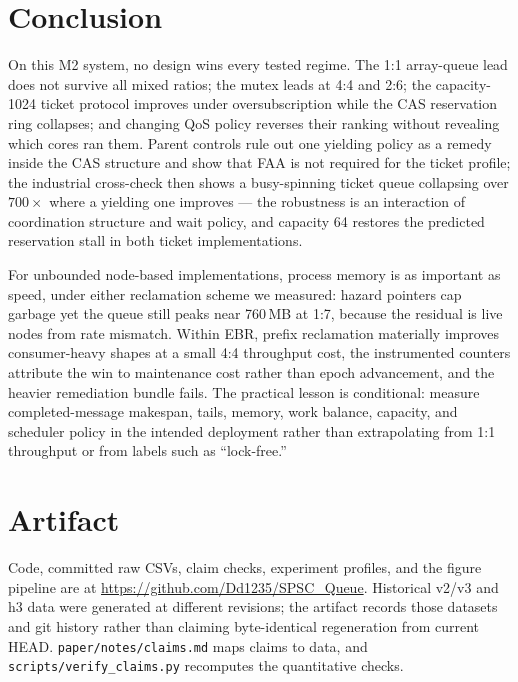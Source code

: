 \documentclass[conference]{IEEEtran}
\begin{document}
\section{Conclusion}
On this M2 system, no design wins every tested regime. The 1:1 array-queue lead
does not survive all mixed ratios; the mutex leads at 4:4 and 2:6; the
capacity-1024 ticket protocol improves under oversubscription while the CAS
reservation ring collapses; and changing QoS policy reverses their ranking
without revealing which cores ran them. Parent controls rule out one yielding
policy as a remedy inside the CAS structure and show that FAA is not required
for the ticket profile; the industrial cross-check then shows a busy-spinning
ticket queue collapsing over $700\times$ where a yielding one improves ---
the robustness is an interaction of coordination structure and wait policy,
and capacity 64 restores the predicted reservation stall in both ticket
implementations.

For unbounded node-based implementations, process memory is as important as
speed, under either reclamation scheme we measured: hazard pointers cap
garbage yet the queue still peaks near 760\,MB at 1:7, because the residual
is live nodes from rate mismatch. Within EBR, prefix reclamation materially
improves consumer-heavy shapes at a small 4:4 throughput cost, the instrumented
counters attribute the win to maintenance cost rather than epoch advancement,
and the heavier remediation bundle fails. The practical lesson is conditional:
measure completed-message makespan, tails, memory, work balance, capacity, and
scheduler policy in the intended deployment rather than extrapolating from 1:1
throughput or from labels such as ``lock-free.''

\section*{Artifact}
Code, committed raw CSVs, claim checks, experiment profiles, and the figure
pipeline are at \url{https://github.com/Dd1235/SPSC_Queue}. Historical v2/v3
and h3 data were generated at different revisions; the artifact records those
datasets and git history rather than claiming byte-identical regeneration from
current HEAD. \texttt{paper/notes/claims.md} maps claims to data, and
\texttt{scripts/verify\_claims.py} recomputes the quantitative checks.



\end{document}
